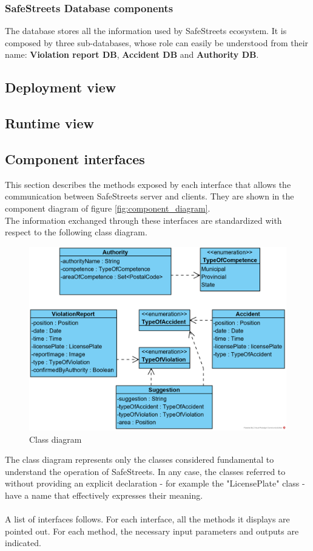 \documentclass{article}
\begin{document}
		\subsubsection{SafeStreets Database components}
		The database stores all the information used by SafeStreets ecosystem. It is composed by three sub-databases, whose role can easily be understood from their name: \textbf{Violation report DB}, \textbf{Accident DB} and \textbf{Authority DB}.
		
		\subsection{Deployment view}
		\subsection{Runtime	view}
		
		\clearpage
		\subsection{Component interfaces}
		This section describes the methods exposed by each interface that allows the communication between SafeStreets server and clients. They are shown in the component diagram of figure \ref{fig:component_diagram}.\\
		The information exchanged through these interfaces are standardized with respect to the following class diagram.\\
		\begin{figure}[H]
			\includegraphics {diagrams/class_diagram.png}
			\caption[Class diagram]{Class diagram}
			\label{fig:class_diagram}
		\end{figure}
		The class diagram represents only the classes considered fundamental to understand the operation of SafeStreets. In any case, the classes referred to without providing an explicit declaration - for example the "LicensePlate" class - have a name that effectively expresses their meaning.\\
		\\
		A list of interfaces follows. For each interface, all the methods it displays are pointed out. For each method, the necessary input parameters and outputs are indicated.\\
		
\end{document}
